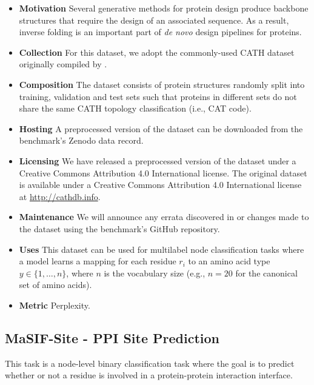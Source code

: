 \begin{itemize}
    \item \textbf{Motivation} Several generative methods for protein design produce backbone structures that require the design of an associated sequence. As a result, inverse folding is an important part of \emph{de novo} design pipelines for proteins.
    \item \textbf{Collection} For this dataset, we adopt the commonly-used CATH dataset originally compiled by \citet{NEURIPS2019_f3a4ff48}.
    \item \textbf{Composition} The dataset consists of protein structures randomly split into training, validation and test sets such that proteins in different sets do not share the same CATH topology classification (i.e., CAT code).
    \item \textbf{Hosting} A preprocessed version of the dataset can be downloaded from the benchmark's Zenodo data record.%
    \item \textbf{Licensing} We have released a preprocessed version of the dataset under a Creative Commons Attribution 4.0 International license. The original dataset is available under a Creative Commons Attribution 4.0 International license at \url{http://cathdb.info}.
    \item \textbf{Maintenance} We will announce any errata discovered in or changes made to the dataset using the benchmark's GitHub repository.%
    \item \textbf{Uses} This dataset can be used for multilabel node classification tasks where a model learns a mapping for each residue $r_i$ to an amino acid type $y \in \{1, \dots, n \}$, where $n$ is the vocabulary size (e.g., $n=20$ for the canonical set of amino acids).
    \item \textbf{Metric} Perplexity.
\end{itemize}



\subsection{MaSIF-Site - PPI Site Prediction}

This task is a node-level binary classification task where the goal is to predict whether or not a residue is involved in a protein-protein interaction interface.


